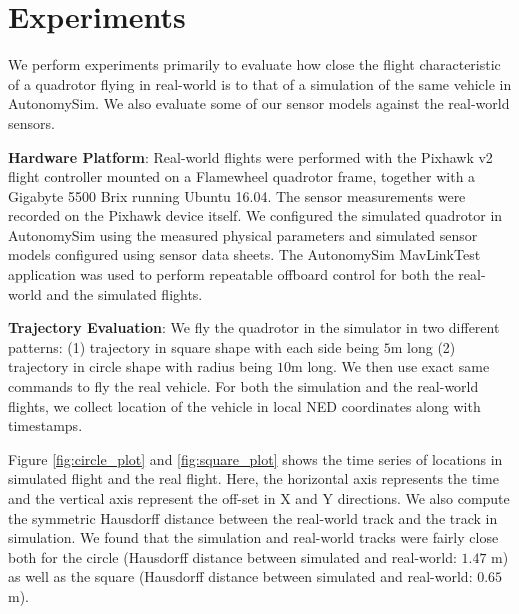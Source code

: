 \documentclass[graybox]{svmult}
\begin{document}
	
	
	\section{Experiments}
	We perform experiments primarily to evaluate how close the flight characteristic of a quadrotor flying in real-world is to that of a simulation of the same vehicle in AutonomySim. We also evaluate some of our sensor models against the real-world sensors.
	
	\vspace{0.075in}
	\noindent \textbf{Hardware Platform}: Real-world flights were performed with the Pixhawk v2 flight controller mounted on a Flamewheel quadrotor frame, together with a Gigabyte 5500 Brix running Ubuntu 16.04. The sensor measurements were recorded on the Pixhawk device itself. We configured the simulated quadrotor in AutonomySim using the measured physical parameters and simulated sensor models configured using sensor data sheets. The AutonomySim MavLinkTest application was used to perform repeatable offboard control for both the real-world and the simulated flights.
	
	\vspace{0.075in}
	\noindent \textbf{Trajectory Evaluation}: We fly the quadrotor in the simulator in two different patterns: (1) trajectory in square shape with each side being $5$m long (2) trajectory in circle shape with radius being $10$m long. We then use exact same commands to fly the real vehicle. For both the simulation and the real-world flights, we collect location of the vehicle in local NED coordinates along with timestamps.
	
	Figure \ref{fig:circle_plot} and \ref{fig:square_plot} shows the time series of locations in simulated flight and the real flight. Here, the horizontal axis represents the time and the vertical axis represent the off-set in X and Y directions. We also compute the symmetric Hausdorff distance between the real-world track and the track in simulation. We found that the simulation and real-world tracks were fairly close both for the circle (Hausdorff distance between simulated and real-world: $1.47$ m) as well as the square (Hausdorff distance between simulated and real-world: $0.65$ m).
	
\end{document}
